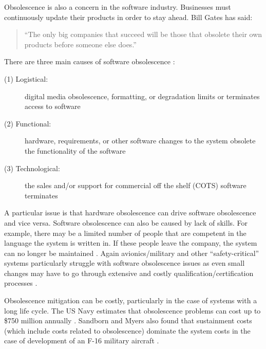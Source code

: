 \documentclass{UoYCSproject}
\begin{document}
Obsolescence is also a concern in the software industry. Businesses must continuously update their products in order to stay ahead. Bill Gates has said: 
\begin{quote}
``The only big companies that succeed will be those that obsolete their own products before someone else does.'' \parencite{bartels2012strategies}
\end{quote}
There are three main causes of software obsolescence \parencite{sandborn2007obsolescence}:
\begin{description}
\item[(1) Logistical:] digital media obsolescence, formatting, or degradation limits or terminates access to software
\item[(2) Functional:] hardware, requirements, or other software changes to the system obsolete the functionality of the software
\item[(3) Technological:]  the sales and/or support for commercial off the shelf (COTS) software terminates
\end{description}
A particular issue is that hardware obsolescence can drive software obsolescence and vice versa. Software obsolescence can also be caused by lack of skills. For example, there may be a limited number of people that are competent in the language the system is written in. If these people leave the company, the system can no longer be maintained \parencite{rajagopal2014software}. Again avionics/military and other ``safety-critical'' systems particularly struggle with software obsolescence issues as even small changes may have to go through extensive and costly qualification/certification processes \parencite{singh2006obsolescence}.

Obsolescence mitigation can be costly, particularly in the case of systems with a long life cycle. The US Navy estimates that obsolescence problems can cost up to \$750 million annually \parencite{adams2005getting}. Sandborn and Myers also found that sustainment costs (which include costs related to obsolescence) dominate the system costs in the case of development of an F-16 military aircraft \parencite{sandborn2008designing}. 
 
\end{document}
